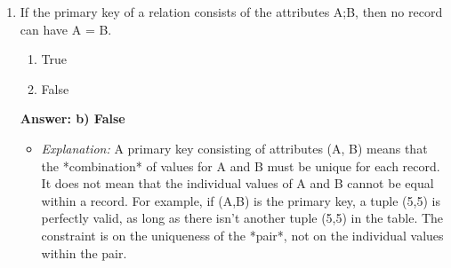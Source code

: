 \documentclass{article}
\begin{document}
\begin{enumerate}[label=\textbf{Question \arabic*.}]

    \item If the primary key of a relation consists of the attributes A;B, then no record can have A = B.
        \begin{enumerate}[label=\alph*)]
            \item True
            \item False
        \end{enumerate}
        \textbf{Answer: b) False}
        \begin{itemize}
            \item \textit{Explanation:} A primary key consisting of attributes (A, B) means that the *combination* of values for A and B must be unique for each record. It does not mean that the individual values of A and B cannot be equal within a record. For example, if (A,B) is the primary key, a tuple (5,5) is perfectly valid, as long as there isn't another tuple (5,5) in the table. The constraint is on the uniqueness of the *pair*, not on the individual values within the pair.
        \end{itemize}
    

\end{enumerate}
\end{document}
